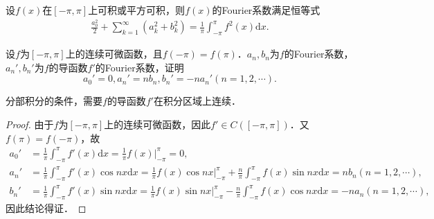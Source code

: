 \documentclass[../../main.tex]{subfiles}%
\begin{document}
\begin{theorem}[Parseval恒等式]\label{theorem:Parseval恒等式}
设$f(x)$在$[-\pi,\pi]$上可积或平方可积，则$f(x)$的Fourier系数满足恒等式
\begin{align*}
\frac{a_0^2}{2}+\sum_{k = 1}^{\infty}(a_k^2 + b_k^2)=\frac{1}{\pi}\int_{-\pi}^{\pi}f^2(x)\mathrm{d}x.
\end{align*}
\end{theorem}

\begin{lemma}\label{lemma:Fourier级数与其导函数的系数关系}
设$f$为$[-\pi,\pi]$上的连续可微函数，且$f(-\pi)=f(\pi)$．$a_n,b_n$为$f$的Fourier系数，$a_{n}',b_{n}'$为$f$的导函数$f'$的Fourier系数，证明
$$a_{0}'=0,a_{n}'=nb_n,b_{n}'=-na_{n}'(n=1,2,\cdots).$$
\end{lemma}
\begin{remark}
分部积分的条件，需要$f$的导函数$f'$在积分区域上连续．
\end{remark}
\begin{proof}

由于$f$为$[-\pi,\pi]$上的连续可微函数，因此$f'\in C([-\pi,\pi])$．又$f(\pi)=f(-\pi)$，故
\begin{align*}
a_{0}'&=\frac{1}{\pi}\int_{-\pi}^{\pi}f'(x)\mathrm{d}x=\frac{1}{\pi}f(x)\Big|_{-\pi}^{\pi}=0,\\
a_{n}'&=\frac{1}{\pi}\int_{-\pi}^{\pi}f'(x)\cos nx\mathrm{d}x=\frac{1}{\pi}f(x)\cos nx\Big|_{-\pi}^{\pi}+\frac{n}{\pi}\int_{-\pi}^{\pi}f(x)\sin nx\mathrm{d}x=nb_n(n=1,2,\cdots),\\
b_{n}'&=\frac{1}{\pi}\int_{-\pi}^{\pi}f'(x)\sin nx\mathrm{d}x=\frac{1}{\pi}f(x)\sin nx\Big|_{-\pi}^{\pi}-\frac{n}{\pi}\int_{-\pi}^{\pi}f(x)\cos nx\mathrm{d}x=-na_n(n=1,2,\cdots),
\end{align*}
因此结论得证．

\end{proof}
\end{document}
